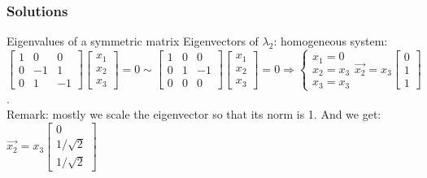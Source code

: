 \begin{frame}
	\frametitle{Solutions}
	\begin{block}{Eigenvalues of a symmetric matrix}
		Eigenvectors of $\lambda_2$: homogeneous system:\\
		$\begin{bmatrix}
		1 & 0& 0\\
		0 & -1 & 1\\
		0 & 1 & -1
		\end{bmatrix}\begin{bmatrix}
		x_1\\x_2\\x_3
		\end{bmatrix}=0 \sim \begin{bmatrix}
		1 & 0& 0\\
		0 & 1 & -1\\
		0 & 0 & 0
		\end{bmatrix}\begin{bmatrix}
		x_1\\x_2\\x_3
		\end{bmatrix}=0 \Rightarrow \begin{cases}
		x_1=0\\x_2=x_3\\x_3=x_3
		\end{cases} \overrightarrow{x_2}=x_3\begin{bmatrix}
		0\\1\\1
		\end{bmatrix}$. \\
		Remark: mostly we scale the eigenvector so that its norm is 1. And we get: $\overrightarrow{x_2}=x_3\begin{bmatrix}
		0\\1/\sqrt{2}\\1/\sqrt{2}
		\end{bmatrix}$
	\end{block}
\end{frame}

